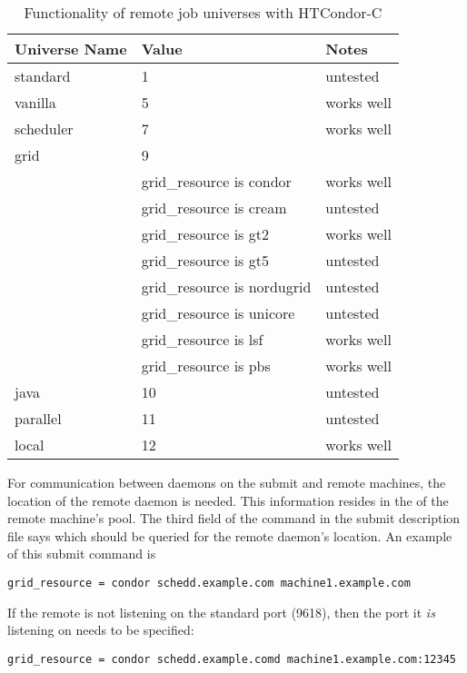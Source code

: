 \begin{center}
\begin{table}[hbt]
\begin{tabular}{|l|l|l}
\textbf{Universe Name} & \textbf{Value} & \textbf{Notes}\\ \hline \hline
standard  & 1 & untested \\ \hline
vanilla   & 5 & works well \\ \hline
scheduler & 7 & works well \\ \hline
grid      & 9 & \\
 & grid\_resource is condor & works well \\
 & grid\_resource is cream & untested \\
 & grid\_resource is gt2  & works well \\
 & grid\_resource is gt5 & untested \\ 
 & grid\_resource is nordugrid & untested \\ 
 & grid\_resource is unicore & untested \\
 & grid\_resource is lsf & works well \\
 & grid\_resource is pbs & works well \\ \hline
java & 10 & untested \\ \hline
parallel & 11 & untested \\ \hline
local & 12 & works well \\ \hline
\end{tabular}
\caption{\label{working-remote-universes}Functionality of remote job universes with HTCondor-C}
\end{table}
\end{center}

For communication between  daemons on the submit
and remote machines,
the location of the remote  daemon is needed.
This information resides in the  of the remote
machine's pool.
The third field of the  command in the submit description file
says which  should be queried for the remote 
daemon's location.
An example of this submit command is
\footnotesize
\begin{verbatim}
grid_resource = condor schedd.example.com machine1.example.com
\end{verbatim}
\normalsize
If the remote  is not listening on the standard port
(9618), then the port it \emph{is} listening on needs to be specified:
\footnotesize
\begin{verbatim}
grid_resource = condor schedd.example.comd machine1.example.com:12345
\end{verbatim}
\normalsize

